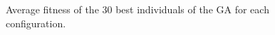 \documentclass{sig-alternate}
\begin{document}
\begin{figure}[htb]
\centering

\caption{Average fitness of the 30 best individuals of the GA for each configuration.}

\label{fig:graph}
\end{figure}
\end{document}
